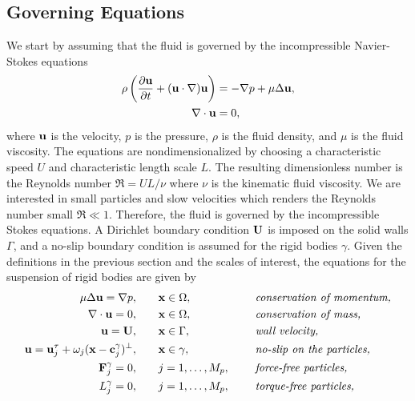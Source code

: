 \documentclass[preprint, 10pt]{elsarticle}
\begin{document}
\subsection{Governing Equations}\label{sec:governing}
We start by assuming that the fluid is governed by the incompressible
Navier-Stokes equations 
\begin{align*}
  \rho\left(\frac{\partial {\mathbf{u}}}{\partial t} + ({\mathbf{u}} \cdot {\nabla}) {\mathbf{u}} \right) &= 
    -{\nabla} p + \mu \Delta {\mathbf{u}}, \\
    {\nabla} \cdot {\mathbf{u}} &= 0,
\end{align*}
where ${\mathbf{u}}$ is the velocity, $p$ is the pressure, $\rho$ is the fluid
density, and $\mu$ is the fluid viscosity.  The equations are
nondimensionalized by choosing a characteristic speed $U$ and
characteristic length scale $L$.  The resulting dimensionless number is
the Reynolds number $\Re = UL/\nu$ where $\nu$ is the kinematic fluid
viscosity.  We are interested in small particles and slow velocities
which renders the Reynolds number small $\Re \ll 1$.  Therefore, the
fluid is governed by the incompressible Stokes equations.  A Dirichlet
boundary condition ${\mathbf{U}}$ is imposed on the solid walls $\Gamma$, and a
no-slip boundary condition is assumed for the rigid bodies $\gamma$.
Given the definitions in the previous section and the scales of
interest, the equations for the suspension of rigid bodies are given by
\begin{equation}
  \label{eqn:modelEquations}
  \begin{split}
  \mu \Delta {\mathbf{u}} = {\nabla} p, &\hspace{20pt} {\mathbf{x}} \in \Omega, \hspace*{.2in}
    &&\mbox{\em conservation of momentum,}\\
  {\nabla} \cdot {\mathbf{u}} = 0, &\hspace{20pt} {\mathbf{x}} \in \Omega, \hspace*{.2in}
    &&\mbox{\em conservation of mass,} \\
  {\mathbf{u}} = {\mathbf{U}}, &\hspace{20pt} {\mathbf{x}} \in \Gamma, \hspace*{.2in} 
    &&\mbox{\em wall velocity,} \\
  {\mathbf{u}} = {\mathbf{u}}^\tau_j + \omega_j({\mathbf{x}}-{\mathbf{c}}^\gamma_j)^\perp,&\hspace{20pt} 
    {\mathbf{x}} \in \gamma, \hspace*{.2in} &&\mbox{\em no-slip on the particles,} \\
  {\mathbf{F}}_j^\gamma = 0, &\hspace{20pt}j=1,\ldots,M_p, \hspace*{.2in} 
    &&\mbox{\em force-free particles,} \\
  L_j^\gamma = 0, &\hspace{20pt}j=1,\ldots,M_p, \hspace*{.2in} 
    &&\mbox{\em torque-free particles,}
  \end{split}
\end{equation}
\end{document}
